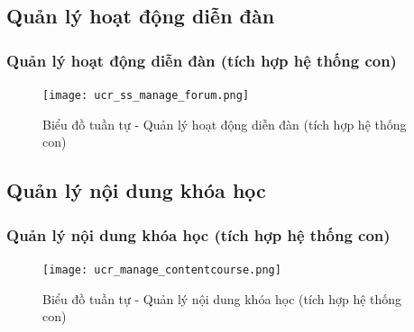 \documentclass[./../main.tex]{subfiles}
\begin{document}
\subsection{Quản lý hoạt động diễn đàn}
\subsubsection{Quản lý hoạt động diễn đàn (tích hợp hệ thống con)}
\begin{figure}[H]
    \centering
    \texttt{[image: ucr\_ss\_manage\_forum.png]}
    \caption{Biểu đồ tuần tự - Quản lý hoạt động diễn đàn (tích hợp hệ thống con)}
\end{figure}

\subsection{Quản lý nội dung khóa học}
\subsubsection{Quản lý nội dung khóa học (tích hợp hệ thống con)}
\begin{figure}[H]
    \centering
    \texttt{[image: ucr\_manage\_contentcourse.png]}
    \caption{Biểu đồ tuần tự - Quản lý nội dung khóa học (tích hợp hệ thống con)}
\end{figure}
\end{document}
